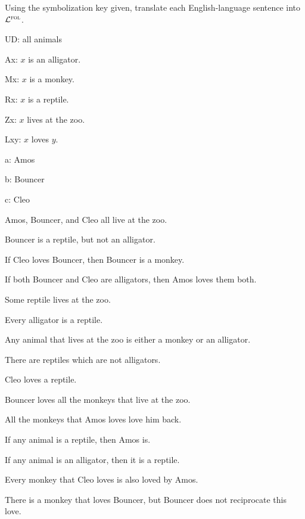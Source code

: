 \solutions
\problempart
\label{pr.$\FOL$alligators}
Using the symbolization key given, translate each English-language sentence into $\FOL$.
\begin{ekey}
\item[UD:] all animals
\item[Ax:] $x$ is an alligator.
\item[Mx:] $x$ is a monkey.
\item[Rx:] $x$ is a reptile.
\item[Zx:] $x$ lives at the zoo.
\item[Lxy:] $x$ loves $y$.
\item[a:] Amos
\item[b:] Bouncer
\item[c:] Cleo
\end{ekey}
\begin{earg}
\item Amos, Bouncer, and Cleo all live at the zoo. 
\item Bouncer is a reptile, but not an alligator. 
\item If Cleo loves Bouncer, then Bouncer is a monkey. 
\item If both Bouncer and Cleo are alligators, then Amos loves them both.
\item Some reptile lives at the zoo. 
\item Every alligator is a reptile. 
\item Any animal that lives at the zoo is either a monkey or an alligator. 
\item There are reptiles which are not alligators.
\item Cleo loves a reptile.
\item Bouncer loves all the monkeys that live at the zoo.
\item All the monkeys that Amos loves love him back.
\item If any animal is a reptile, then Amos is.
\item If any animal is an alligator, then it is a reptile.
\item Every monkey that Cleo loves is also loved by Amos.
\item There is a monkey that loves Bouncer, but Bouncer does not reciprocate this love.
\end{earg}



